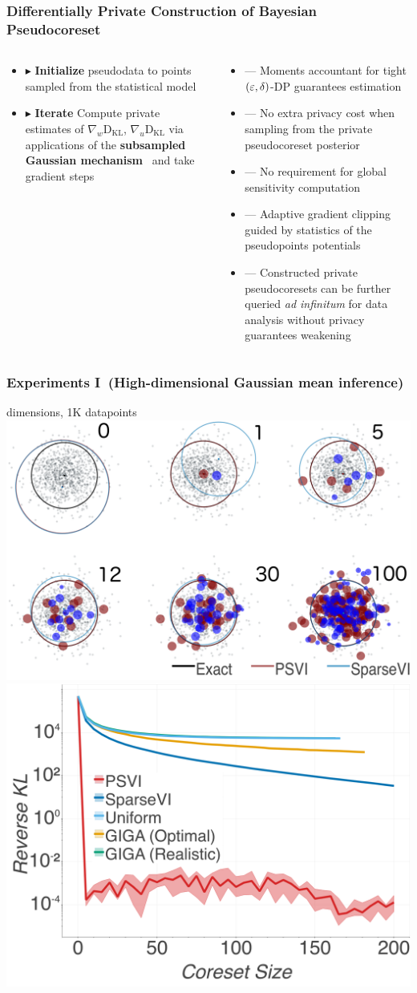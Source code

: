 \documentclass[hyperref={colorlinks = true},unknownkeysallowed]{beamer}
\let\oldcitep=\citep
\renewcommand\citep[1]{\hypersetup{linkcolor=UBCblue}\hyperlink{#1}{\oldcitep{#1}}}
\begin{document}
\begin{frame}
	\frametitle{Differentially Private Construction of Bayesian Pseudocoreset}
	\vspace{-0.7cm}
	\begin{columns}
		\begin{column}[t]{0.4\textwidth}
		\begin{itemize}
			\item $\blacktriangleright$ \textbf{Initialize} pseudodata to points sampled from the statistical model
			\item $\blacktriangleright$ \textbf{Iterate} Compute private estimates of $\nabla_w\mathrm{D}_{\mathrm{KL}}$, $\nabla_u\mathrm{D}_{\mathrm{KL}}$ via applications of the \textbf{subsampled Gaussian mechanism}~\citep{abadi16} and take gradient steps
		\end{itemize}
		\end{column}
	\pause
		\begin{column}[t]{0.6\textwidth}
		\begin{itemize}
			\item --- Moments accountant for tight $(\varepsilon, \delta)$-DP guarantees estimation
			\item --- No extra privacy cost when sampling from the private pseudocoreset posterior
			\item --- No requirement for global sensitivity computation
			\item --- Adaptive gradient clipping guided by statistics of the pseudopoints potentials
			\item --- Constructed private pseudocoresets can be further queried \emph{ad infinitum} for data analysis without privacy guarantees weakening
		\end{itemize}
		\end{column}
	\end{columns}
\end{frame}

\begin{frame}
	\frametitle{Experiments I~(High-dimensional Gaussian mean inference)}
	 dimensions, 1K datapoints\\
	\includegraphics[width=.49\textwidth]{figs/d500_pts_combined.png}
	\includegraphics[width=.49\textwidth]{figs/d500_KLDvsCstSize.png}
\end{frame}
\end{document}
